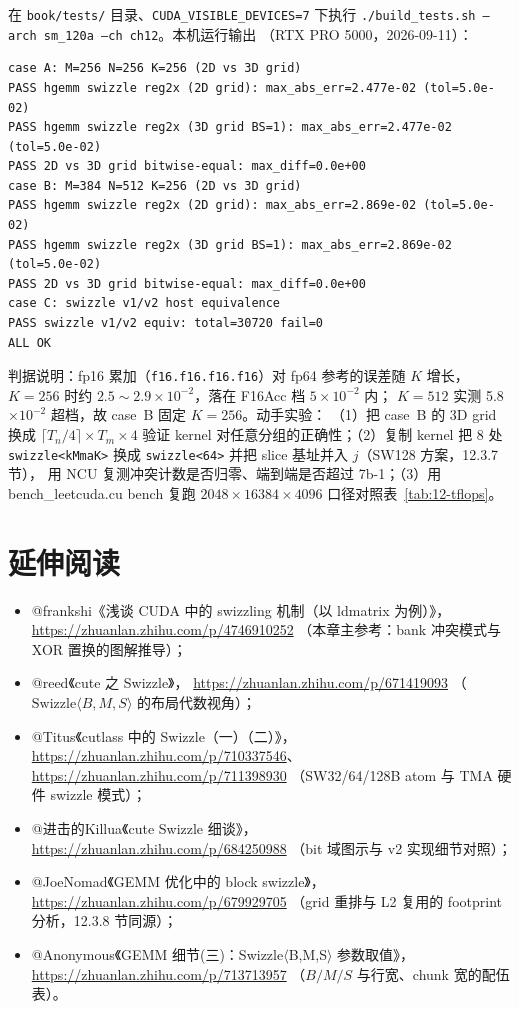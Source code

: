 在 \texttt{book/tests/} 目录、\texttt{CUDA\_\allowbreak{}VISIBLE\_\allowbreak{}DEVICES=\allowbreak{}7} 下执行
\texttt{.\allowbreak{}/\allowbreak{}build\_\allowbreak{}tests.\allowbreak{}sh --arch sm\_\allowbreak{}120a --ch ch12}。本机运行输出
（RTX PRO 5000，2026-09-11）：

\begin{lstlisting}[style=console]
case A: M=256 N=256 K=256 (2D vs 3D grid)
PASS hgemm swizzle reg2x (2D grid): max_abs_err=2.477e-02 (tol=5.0e-02)
PASS hgemm swizzle reg2x (3D grid BS=1): max_abs_err=2.477e-02 (tol=5.0e-02)
PASS 2D vs 3D grid bitwise-equal: max_diff=0.0e+00
case B: M=384 N=512 K=256 (2D vs 3D grid)
PASS hgemm swizzle reg2x (2D grid): max_abs_err=2.869e-02 (tol=5.0e-02)
PASS hgemm swizzle reg2x (3D grid BS=1): max_abs_err=2.869e-02 (tol=5.0e-02)
PASS 2D vs 3D grid bitwise-equal: max_diff=0.0e+00
case C: swizzle v1/v2 host equivalence
PASS swizzle v1/v2 equiv: total=30720 fail=0
ALL OK
\end{lstlisting}

判据说明：fp16 累加（\texttt{f16.f16.f16.f16}）对 fp64 参考的误差随 $K$ 增长，
$K{=}256$ 时约 $2.5{\sim}2.9\times10^{-2}$，落在 F16Acc 档 $5\times10^{-2}$ 内；
$K{=}512$ 实测 5.8$\times10^{-2}$ 超档，故 case~B 固定 $K{=}256$。动手实验：
（1）把 case~B 的 3D grid 换成 $\lceil T_n/4\rceil\times T_m\times 4$ 验证
kernel 对任意分组的正确性；（2）复制 kernel 把 8 处 \texttt{swizzle\allowbreak{}<k\allowbreak{}Mma\allowbreak{}K>}
换成 \texttt{swizzle<64>} 并把 slice 基址并入 $j$（SW128 方案，12.3.7 节），
用 NCU 复测冲突计数是否归零、端到端是否超过 7b-1；（3）用
bench\_leetcuda.cu bench 复跑 $2048\times16384\times4096$ 口径对照表~\ref{tab:12-tflops}。

\section*{延伸阅读}

\begin{itemize}
  \item @frankshi《浅谈 CUDA 中的 swizzling 机制（以 ldmatrix 为例）》，
        \url{https://zhuanlan.zhihu.com/p/4746910252}
        （本章主参考：bank 冲突模式与 XOR 置换的图解推导）；
  \item @reed《cute 之 Swizzle》，
        \url{https://zhuanlan.zhihu.com/p/671419093}
        （$\mathrm{Swizzle}\langle B,M,S\rangle$ 的布局代数视角）；
  \item @Titus《cutlass 中的 Swizzle（一）（二）》，
        \url{https://zhuanlan.zhihu.com/p/710337546}、
        \url{https://zhuanlan.zhihu.com/p/711398930}
        （SW32/64/128B atom 与 TMA 硬件 swizzle 模式）；
  \item @进击的Killua《cute Swizzle 细谈》，
        \url{https://zhuanlan.zhihu.com/p/684250988}
        （bit 域图示与 v2 实现细节对照）；
  \item @JoeNomad《GEMM 优化中的 block swizzle》，
        \url{https://zhuanlan.zhihu.com/p/679929705}
        （grid 重排与 L2 复用的 footprint 分析，12.3.8 节同源）；
  \item @Anonymous《GEMM 细节(三)：Swizzle$\langle$B,M,S$\rangle$ 参数取值》，
        \url{https://zhuanlan.zhihu.com/p/713713957}
        （$B/M/S$ 与行宽、chunk 宽的配伍表）。
\end{itemize}
